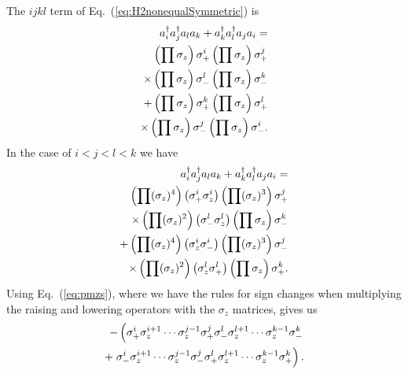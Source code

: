 \documentclass[aps,pra,twocolumn,floatfix]{revtex4}
\begin{document}
The $ijkl$ term of Eq.~(\ref{eq:H2nonequalSymmetric}) is 
\begin{eqnarray}
a^\dag_i a^\dag_j a_l a_k + a_k^\dag
a_l^\dag a_j a_i= 
\notag\\
\left(\prod \sigma_z \right) \sigma_+^i \left(\prod \sigma_z \right)
\sigma_+^j \notag \\
\times\left(\prod \sigma_z \right) \sigma_-^l
\left(\prod \sigma_z \right) \sigma_-^k \notag \\
+\left(\prod \sigma_z \right) \sigma_+^k \left(\prod \sigma_z \right)
\sigma_+^l \notag \\
\times
\left(\prod \sigma_z \right) \sigma_-^j
\left(\prod \sigma_z \right) \sigma_-^i .
\end{eqnarray}
In the case of $i<j<l<k$ we have
\begin{eqnarray}
\label{eq:VijklPhi}
a^\dag_i a^\dag_j a_l a_k+ a_k^\dag a_l^\dag a_j a_i=\notag\\
\left(\prod (\sigma_z)^4\right) \left(\sigma_+^i \sigma_z^i\right)
\left(\prod (\sigma_z)^3\right) \sigma_+^j \notag \\
\times
\left(\prod (\sigma_z)^2\right) \left(\sigma_-^l \sigma_z^l \right)
\left(\prod \sigma_z\right) \sigma_-^k \notag \\
+\left(\prod (\sigma_z)^4\right) \left(\sigma_z^i\sigma_-^i\right)
\left(\prod (\sigma_z)^3\right) \sigma_-^j \notag \\
\times
\left(\prod (\sigma_z)^2\right) \left(\sigma_z^l\sigma_+^l \right)
\left(\prod \sigma_z\right) \sigma_+^k .
\end{eqnarray}
Using Eq.~(\ref{eq:pmzs}), where  we have the rules for sign changes when
multiplying the raising and lowering operators with the $\sigma_z$
matrices, gives us
\begin{eqnarray}
-\left(\sigma_+^i \sigma_z^{i+1}\cdots \sigma_z^{j-1} \sigma_+^j
\sigma_-^l \sigma_z^{l+1}\cdots \sigma_z^{k-1}\sigma_-^k\right. 
\notag\\
+ \left.\sigma_-^i \sigma_z^{i+1}\cdots \sigma_z^{j-1} \sigma_-^j
\sigma_+^l \sigma_z^{l+1}\cdots \sigma_z^{k-1}\sigma_+^k\right).
\end{eqnarray}
\end{document}

